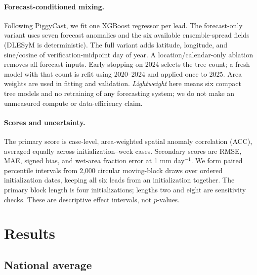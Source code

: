 \documentclass[10pt,twocolumn]{article}
\begin{document}
\paragraph{Forecast-conditioned mixing.}
Following PiggyCast, we fit one XGBoost regressor
\citep{chen2016xgboost} per lead. The forecast-only variant uses seven forecast
anomalies and the six available ensemble-spread fields (DLESyM is
deterministic). The full variant adds latitude, longitude, and sine/cosine of
verification-midpoint day of year. A location/calendar-only ablation removes
all forecast inputs. Early stopping on 2024 selects the tree count; a fresh
model with that count is refit using 2020--2024 and applied once to 2025.
Area weights are used in fitting and validation. \emph{Lightweight} here means
six compact tree models and no retraining of any forecasting system; we do not
make an unmeasured compute or data-efficiency claim.

\paragraph{Scores and uncertainty.}
The primary score is case-level, area-weighted spatial anomaly correlation
(ACC), averaged equally across initialization--week cases. Secondary scores
are RMSE, MAE, signed bias, and wet-area fraction error at 1 mm day$^{-1}$.
We form paired percentile intervals from 2,000 circular moving-block draws
over ordered initialization dates, keeping all six leads from an
initialization together. The primary block length is four initializations;
lengths two and eight are sensitivity checks. These are descriptive effect
intervals, not $p$-values.

\section{Results}

\subsection{National average}

\begin{table}[t]
\centering\small
\caption{Mean 2025 India scores over \TestCases{} JJAS initializations and six
leads. RMSE, MAE, and bias are in mm day$^{-1}$. The table retains only
claim-relevant comparators; all systems and wet-area error are in the
appendix.}
\label{tab:headline}
\resizebox{0.83\textwidth}{!}{}
\end{table}
\end{document}
